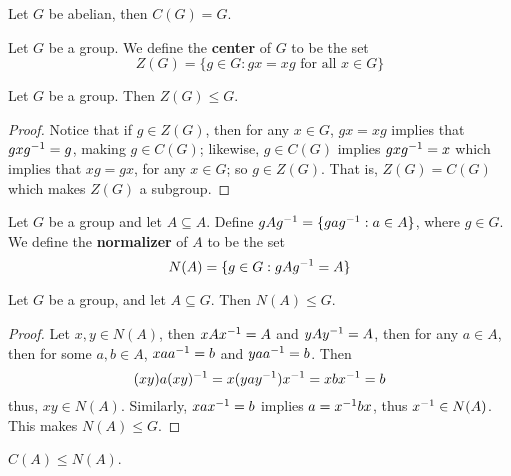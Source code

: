\begin{example}\label{example_2.3}
  Let $G$ be abelian, then  $C(G)=G$.
\end{example}

\begin{definition}
  Let $G$ be a group. We define the  \textbf{center} of $G$ to be the set
  \begin{equation*}
    Z(G)=\{g \in G : gx=xg \text{ for all } x \in G\}
  \end{equation*}
\end{definition}

\begin{proposition}\label{proposition_2.2.2}
  Let  $G$ be a group. Then  $Z(G) \leq G$.
\end{proposition}
\begin{proof}
  Notice that if $g \in Z(G)$, then for any $x \in G$, $gx=xg$ implies that
  $gxg^{-1}=g$, making $g \in C(G)$; likewise, $g \in C(G)$ implies
  $gxg^{-1}=x$ which implies that $xg=gx$, for any  $x \in G$; so  $g \in
  Z(G)$. That is, $Z(G)=C(G)$ which makes $Z(G)$ a subgroup.
\end{proof}

\begin{definition}
  Let $G$ be a group and let  $A \subseteq A$. Define $gAg^{-1}=\{gag^{-1} :
  a \in A\}$, where $g \in G$. We define the \textbf{normalizer} of $A$ to be
  the set
  \begin{equation*}
    N(A)=\{g \in G : gAg^{-1}=A\}
  \end{equation*}
\end{definition}

\begin{proposition}\label{proposition_2.2.3}
  Let $G$ be a group, and let  $A \subseteq G$. Then  $N(A) \leq G$.
\end{proposition}
\begin{proof}
  Let $x,y \in N(A)$, then $xAx^{-1}=A$ and $yAy^{-1}=A$, then for any  $a
  \in A$, then for some $a,b \in A$, $xaa^{-1}=b$ and $yaa^{-1}=b$. Then
  \begin{equation*}
    (xy)a(xy)^{-1}=x(yay^{-1})x^{-1}=xbx^{-1}=b
  \end{equation*}
  thus, $xy \in N(A)$. Similarly, $xax^{-1}=b$ implies $a=x^{-1}bx$,
  thus $x^{-1} \in N(A)$. This makes $N(A) \leq G$.
\end{proof}
\begin{corollary}
  $C(A) \leq N(A)$.
\end{corollary}

